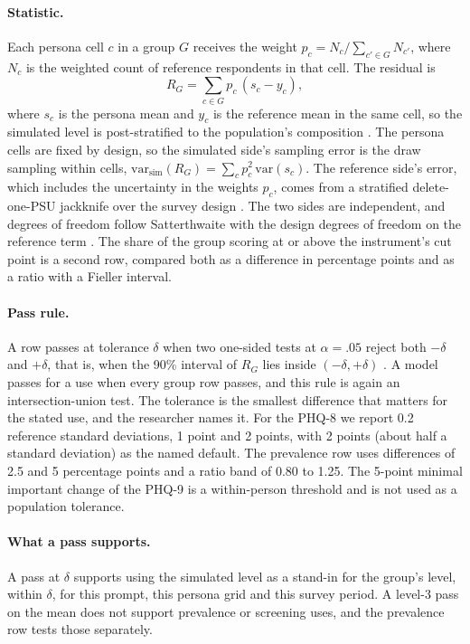 \paragraph{Statistic.}
Each persona cell $c$ in a group $G$ receives the weight $p_c = N_c / \sum_{c' \in G} N_{c'}$, where $N_c$ is the weighted count of reference respondents in that cell.
The residual is
\begin{equation}
R_G = \sum_{c \in G} p_c\,(s_c - y_c),
\end{equation}
where $s_c$ is the persona mean and $y_c$ is the reference mean in the same cell, so the simulated level is post-stratified to the population's composition \citep{holtsmith1979poststrat}.
The persona cells are fixed by design, so the simulated side's sampling error is the draw sampling within cells, $\mathrm{var}_{\mathrm{sim}}(R_G) = \sum_c p_c^2\,\mathrm{var}(s_c)$.
The reference side's error, which includes the uncertainty in the weights $p_c$, comes from a stratified delete-one-PSU jackknife over the survey design \citep{rustrao1996replication}.
The two sides are independent, and degrees of freedom follow Satterthwaite with the design degrees of freedom on the reference term \citep{satterthwaite1946approximate}.
The share of the group scoring at or above the instrument's cut point is a second row, compared both as a difference in percentage points and as a ratio with a Fieller interval.

\paragraph{Pass rule.}
A row passes at tolerance $\delta$ when two one-sided tests at $\alpha = .05$ reject both $-\delta$ and $+\delta$, that is, when the 90\% interval of $R_G$ lies inside $(-\delta, +\delta)$ \citep{schuirmann1987tost,lakens2018tutorial}.
A model passes for a use when every group row passes, and this rule is again an intersection-union test.
The tolerance is the smallest difference that matters for the stated use, and the researcher names it.
For the PHQ-8 we report 0.2 reference standard deviations, 1 point and 2 points, with 2 points (about half a standard deviation) as the named default.
The prevalence row uses differences of 2.5 and 5 percentage points and a ratio band of 0.80 to 1.25.
The 5-point minimal important change of the PHQ-9 \citep{lowe2004monitoring} is a within-person threshold and is not used as a population tolerance.

\paragraph{What a pass supports.}
A pass at $\delta$ supports using the simulated level as a stand-in for the group's level, within $\delta$, for this prompt, this persona grid and this survey period.
A level-3 pass on the mean does not support prevalence or screening uses, and the prevalence row tests those separately.

